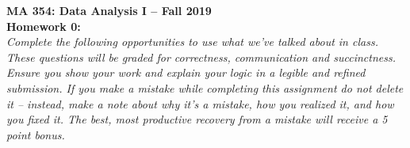 \documentclass{article}
\begin{document}

\noindent \textbf{MA 354: Data Analysis I -- Fall 2019}\\%
\noindent \textbf{Homework 0:}\vspace{1em}\\
\emph{Complete the following opportunities to use what we've talked about in class. 
These questions will be graded for correctness, communication and succinctness. Ensure
you show your work and explain your logic in a legible and refined submission. If you
make a mistake while completing this assignment do not delete it -- instead, make a note
about why it's a mistake, how you realized it, and how you fixed it. The best, most 
productive recovery from a mistake will receive a 5 point bonus.}
\end{document}
